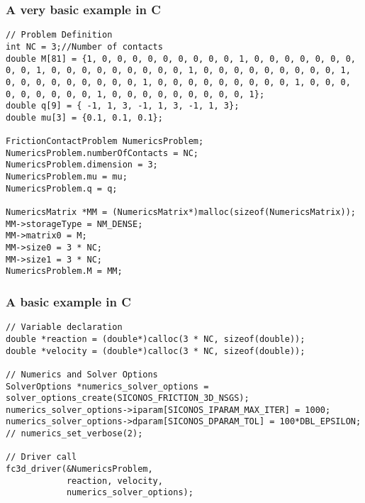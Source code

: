 \begin{frame}[fragile]
  \frametitle{A very basic example in C}
    {\small
      \begin{verbatim}
// Problem Definition
int NC = 3;//Number of contacts
double M[81] = {1, 0, 0, 0, 0, 0, 0, 0, 0, 0, 1, 0, 0, 0, 0, 0, 0, 0, 0, 0, 1, 0, 0, 0, 0, 0, 0, 0, 0, 0, 1, 0, 0, 0, 0, 0, 0, 0, 0, 0, 1, 0, 0, 0, 0, 0, 0, 0, 0, 0, 1, 0, 0, 0, 0, 0, 0, 0, 0, 0, 1, 0, 0, 0, 0, 0, 0, 0, 0, 0, 1, 0, 0, 0, 0, 0, 0, 0, 0, 0, 1};
double q[9] = { -1, 1, 3, -1, 1, 3, -1, 1, 3};
double mu[3] = {0.1, 0.1, 0.1};

FrictionContactProblem NumericsProblem;
NumericsProblem.numberOfContacts = NC;
NumericsProblem.dimension = 3;
NumericsProblem.mu = mu;
NumericsProblem.q = q;

NumericsMatrix *MM = (NumericsMatrix*)malloc(sizeof(NumericsMatrix));
MM->storageType = NM_DENSE;
MM->matrix0 = M;
MM->size0 = 3 * NC;
MM->size1 = 3 * NC;
NumericsProblem.M = MM;
\end{verbatim}
}
\end{frame}
  
\begin{frame}[fragile]
  \frametitle{A basic example in C}
    {\small
      \begin{verbatim}
// Variable declaration
double *reaction = (double*)calloc(3 * NC, sizeof(double));
double *velocity = (double*)calloc(3 * NC, sizeof(double));

// Numerics and Solver Options
SolverOptions *numerics_solver_options = solver_options_create(SICONOS_FRICTION_3D_NSGS);
numerics_solver_options->iparam[SICONOS_IPARAM_MAX_ITER] = 1000;
numerics_solver_options->dparam[SICONOS_DPARAM_TOL] = 100*DBL_EPSILON;
// numerics_set_verbose(2);

// Driver call
fc3d_driver(&NumericsProblem,
            reaction, velocity,
            numerics_solver_options);
        
      \end{verbatim}
    }
  \end{frame}

